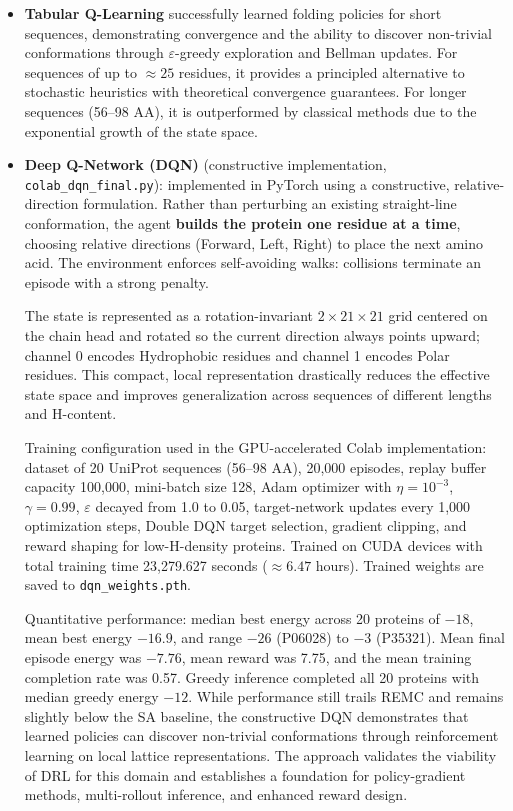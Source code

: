 \begin{itemize}
    \item \textbf{Tabular Q-Learning} successfully learned folding policies for short sequences, demonstrating convergence and the ability to discover non-trivial conformations through $\varepsilon$-greedy exploration and Bellman updates. For sequences of up to $\approx 25$ residues, it provides a principled alternative to stochastic heuristics with theoretical convergence guarantees. For longer sequences (56--98 AA), it is outperformed by classical methods due to the exponential growth of the state space.
    \item \textbf{Deep Q-Network (DQN)} (constructive implementation, \texttt{colab\_dqn\_final.py}): implemented in PyTorch using a constructive, relative-direction formulation. Rather than perturbing an existing straight-line conformation, the agent \textbf{builds the protein one residue at a time}, choosing relative directions (Forward, Left, Right) to place the next amino acid. The environment enforces self-avoiding walks: collisions terminate an episode with a strong penalty.

    The state is represented as a rotation-invariant $2 \times 21 \times 21$ grid centered on the chain head and rotated so the current direction always points upward; channel 0 encodes Hydrophobic residues and channel 1 encodes Polar residues. This compact, local representation drastically reduces the effective state space and improves generalization across sequences of different lengths and H-content.

    Training configuration used in the GPU-accelerated Colab implementation: dataset of 20 UniProt sequences (56--98 AA), 20,000 episodes, replay buffer capacity 100{,}000, mini-batch size 128, Adam optimizer with $\eta=10^{-3}$, $\gamma=0.99$, $\varepsilon$ decayed from 1.0 to 0.05, target-network updates every 1,000 optimization steps, Double DQN target selection, gradient clipping, and reward shaping for low-H-density proteins. Trained on CUDA devices with total training time 23,279.627 seconds ($\approx 6.47$ hours). Trained weights are saved to \texttt{dqn\_weights.pth}.
    
    Quantitative performance: median best energy across 20 proteins of $-18$, mean best energy $-16.9$, and range $-26$ (P06028) to $-3$ (P35321). Mean final episode energy was $-7.76$, mean reward was 7.75, and the mean training completion rate was 0.57. Greedy inference completed all 20 proteins with median greedy energy $-12$. While performance still trails REMC and remains slightly below the SA baseline, the constructive DQN demonstrates that learned policies can discover non-trivial conformations through reinforcement learning on local lattice representations. The approach validates the viability of DRL for this domain and establishes a foundation for policy-gradient methods, multi-rollout inference, and enhanced reward design.

\end{itemize}

